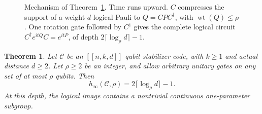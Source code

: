 \documentclass[aps,prl,reprint,notitlepage,nofootinbib,nobibnotes]{revtex4-2}
\newtheorem{theorem}{Theorem}
\begin{document}
\begin{figure}[!ht]
{%
}
\caption{Mechanism of Theorem~\ref{cor:critical}. Time runs upward.
\(C\) compresses the support of a
weight-\(d\) logical Pauli to \(Q=CPC^\dagger\), with
\(\operatorname{wt}(Q)\le\rho\). One rotation gate followed by
\(C^\dagger\) gives the complete logical circuit
\(C^\dagger e^{itQ}C=e^{itP}\), of depth \(2\lceil\log_\rho d\rceil-1\).}
\label{fig:pauli-compression}
\end{figure}

\begin{samepage}
\begin{theorem}\label{cor:critical}
Let \(\mathcal C\) be an \([[n,k,d]]\) qubit stabilizer code,
with \(k\ge1\) and actual distance \(d\ge2\). Let \(\rho\ge2\) be an
integer, and allow arbitrary unitary gates on any set of at most \(\rho\)
qubits. Then
\begin{equation}\label{eq:critical}
 h_\infty(\mathcal C,\rho)=2\lceil\log_{\rho} d\rceil-1.
\end{equation}
At this depth, the logical image contains a nontrivial continuous
one-parameter subgroup.
\end{theorem}
\end{samepage}
\end{document}

